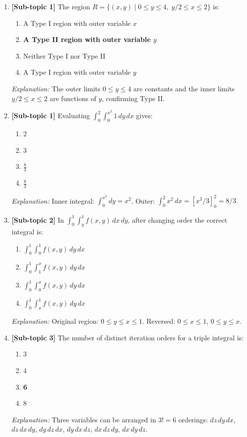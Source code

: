 \documentclass[12pt,a4paper]{article}
\begin{document}
\begin{enumerate}
  \item \textbf{[Sub-topic 1]} The region \(R = \{(x,y) \mid 0\le y\le 4,\; y/2 \le x \le 2\}\) is:
  \begin{enumerate}[label=(\Alph*)]
    \item A Type I region with outer variable \(x\)
    \item \textbf{A Type II region with outer variable \(y\)}
    \item Neither Type I nor Type II
    \item A Type I region with outer variable \(y\)
  \end{enumerate}
  \textit{Explanation:} The outer limits \(0\le y\le 4\) are constants and the inner limits \(y/2 \le x \le 2\) are functions of \(y\), confirming Type II.

  \item \textbf{[Sub-topic 1]} Evaluating \(\displaystyle\int_0^2\int_0^{x^2} 1\,dy\,dx\) gives:
  \begin{enumerate}[label=(\Alph*)]
    \item 2
    \item 3
    \item \(\frac{8}{3}\)
    \item \textbf{\(\frac{8}{3}\)}
  \end{enumerate}
  \textit{Explanation:} Inner integral: \(\int_0^{x^2}dy = x^2\). Outer: \(\int_0^2 x^2\,dx = [x^3/3]_0^2 = 8/3\).

  \item \textbf{[Sub-topic 2]} In \(\displaystyle\int_0^1\int_y^1 f(x,y)\,dx\,dy\), after changing order the correct integral is:
  \begin{enumerate}[label=(\Alph*)]
    \item \(\displaystyle\int_0^1\int_0^1 f(x,y)\,dy\,dx\)
    \item \(\displaystyle\int_0^1\int_1^x f(x,y)\,dy\,dx\)
    \item \textbf{\(\displaystyle\int_0^1\int_0^x f(x,y)\,dy\,dx\)}
    \item \(\displaystyle\int_0^1\int_x^1 f(x,y)\,dy\,dx\)
  \end{enumerate}
  \textit{Explanation:} Original region: \(0\le y\le x\le 1\). Reversed: \(0\le x\le 1\), \(0\le y\le x\).

  \item \textbf{[Sub-topic 3]} The number of distinct iteration orders for a triple integral is:
  \begin{enumerate}[label=(\Alph*)]
    \item 3
    \item 4
    \item \textbf{6}
    \item 8
  \end{enumerate}
  \textit{Explanation:} Three variables can be arranged in \(3! = 6\) orderings: \(dz\,dy\,dx\), \(dz\,dx\,dy\), \(dy\,dz\,dx\), \(dy\,dx\,dz\), \(dx\,dz\,dy\), \(dx\,dy\,dz\).


\end{enumerate}
\end{document}
